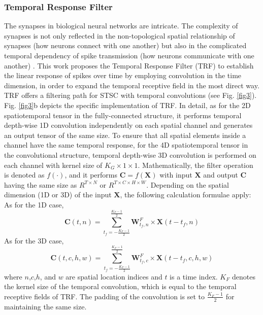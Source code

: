 \documentclass[letterpaper]{article} \usepackage[submission]{aaai23}  \usepackage{times}  \usepackage{helvet}  \usepackage{courier}  \usepackage[hyphens]{url}  \usepackage{graphicx} \urlstyle{rm} \def\UrlFont{\rm}  \usepackage{natbib}  \usepackage{caption} \frenchspacing  \setlength{\pdfpagewidth}{8.5in} \setlength{\pdfpageheight}{11in} \usepackage{algorithm}
\begin{document}
\subsubsection{Temporal Response Filter}
The synapses in biological neural networks are intricate. The complexity of synapses is not only reflected in the non-topological spatial relationship of synapses (how neurons connect with one another) but also in the complicated temporal dependency of spike transmission (how neurons communicate with one another) \cite{letellier_differential_2019}. 
This work proposes the Temporal Response Filter (TRF) to establish the linear response of spikes over time by employing convolution in the time dimension, in order to expand the temporal receptive field in the most direct way. TRF offers a filtering path for STSC with temporal convolutions (see Fig. \ref{fig3}). 
Fig. \ref{fig3}b depicts the specific implementation of TRF. In detail, as for the 2D spatiotemporal tensor in the fully-connected structure, it performs temporal depth-wise 1D convolution independently on each spatial channel and generates an output tensor of the same size. To ensure that all spatial elements inside a channel have the same temporal response, for the 4D spatiotemporal tensor in the convolutional structure, temporal depth-wise 3D convolution is performed on each channel with kernel size of $K_{G} \times 1 \times 1$.
Mathematically, the filter operation is denoted as $f(\cdot)$, and it performs $\mathbf{C}=f(\mathbf{X})$ with input $\mathbf{X}$ and output $\mathbf{C}$ having the same size as $R^{T\times N}$ or $R^{T\times C\times H\times W}$.
Depending on the spatial dimension (1D or 3D) of the input $\mathbf{X}$, the following calculation formulae apply:\\
As for the 1D case,
\begin{equation}
    \mathbf{C}\left( t,n \right) = {\sum\limits_{t_f = - \frac{K_F - 1}{2}}^{\frac{K_F - 1}{2}}{\mathbf{W}^{F}_{t_f,n} \times \mathbf{X}\left( t - t_f,n \right)}}
\end{equation}
As for the 3D case,
\begin{equation}
\mathbf{C}\left( t,c,h,w \right) = {\sum\limits_{t_f = - \frac{K_F - 1}{2}}^{\frac{K_F - 1}{2}}{\mathbf{W}^F_{t_f,c} \times \mathbf{X}\left( t - t_f,c,h,w \right)}} 
\end{equation}
where $n$,$c$,$h$, and $w$ are spatial location indices and $t$ is a time index. $K_F$ denotes the kernel size of the temporal convolution, which is equal to the temporal receptive fields of TRF. The padding of the convolution is set to $\frac{K_F-1}{2}$ for maintaining the same size.
\end{document}
